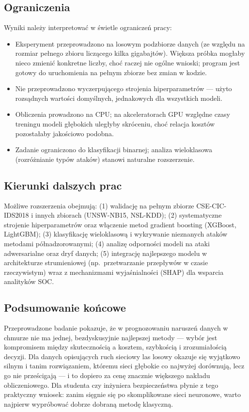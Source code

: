 \subsection{Ograniczenia}

Wyniki należy interpretować w świetle ograniczeń pracy:
\begin{itemize}
  \item Eksperyment przeprowadzono na losowym podzbiorze danych
        \texttt{\resDataSource} (ze względu na rozmiar pełnego zbioru liczącego
        kilka gigabajtów). Większa próbka mogłaby nieco zmienić konkretne
        liczby, choć raczej nie ogólne wnioski; program jest gotowy do
        uruchomienia na pełnym zbiorze bez zmian w kodzie.
  \item Nie przeprowadzono wyczerpującego strojenia hiperparametrów --- użyto
        rozsądnych wartości domyślnych, jednakowych dla wszystkich modeli.
  \item Obliczenia prowadzono na CPU; na akceleratorach GPU względne czasy
        treningu modeli głębokich uległyby skróceniu, choć relacja kosztów
        pozostałaby jakościowo podobna.
  \item Zadanie ograniczono do klasyfikacji binarnej; analiza wieloklasowa
        (rozróżnianie typów ataków) stanowi naturalne rozszerzenie.
\end{itemize}

\subsection{Kierunki dalszych prac}

Możliwe rozszerzenia obejmują: (1) walidację na pełnym zbiorze CSE-CIC-IDS2018 i
innych zbiorach (UNSW-NB15, NSL-KDD); (2) systematyczne strojenie
hiperparametrów oraz włączenie metod gradient boosting (XGBoost, LightGBM);
(3) klasyfikację wieloklasową i wykrywanie nieznanych ataków metodami
półnadzorowanymi; (4) analizę odporności modeli na ataki adwersarialne oraz
dryf danych; (5) integrację najlepszego modelu w architekturze strumieniowej
(np.\ przetwarzanie przepływów w czasie rzeczywistym) wraz z mechanizmami
wyjaśnialności (SHAP) dla wsparcia analityków SOC.

\subsection{Podsumowanie końcowe}

Przeprowadzone badanie pokazuje, że w prognozowaniu naruszeń danych w chmurze
nie ma jednej, bezdyskusyjnie najlepszej metody --- wybór jest kompromisem
między skutecznością a kosztem, szybkością i zrozumiałością decyzji. Dla danych
opisujących ruch sieciowy las losowy okazuje się wyjątkowo silnym i tanim
rozwiązaniem, któremu sieci głębokie co najwyżej dorównują, lecz go nie
prześcigają --- i to dopiero za cenę znacznie większego nakładu obliczeniowego.
Dla studenta czy inżyniera bezpieczeństwa płynie z tego praktyczny wniosek:
zanim sięgnie się po skomplikowane sieci neuronowe, warto najpierw wypróbować
dobrze dobraną metodę klasyczną.
